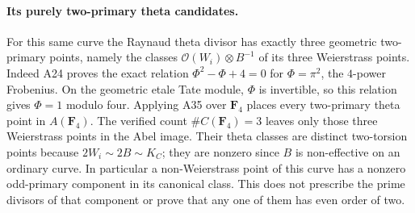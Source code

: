 \paragraph{Its purely two-primary theta candidates.}
For this same curve the Raynaud theta divisor has exactly three
geometric two-primary points, namely the classes
$\mathcal O(W_i)\otimes B^{-1}$ of its three Weierstrass points.
Indeed A24 proves the exact relation
$\Phi^2-\Phi+4=0$ for $\Phi=\pi^2$, the $4$-power Frobenius.
On the geometric etale Tate module, $\Phi$ is invertible, so
this relation gives $\Phi=1$ modulo four. Applying A35 over
$\mathbf F_4$ places every two-primary theta point in
$A(\mathbf F_4)$. The verified count
$\#C(\mathbf F_4)=3$ leaves only those three Weierstrass
points in the Abel image. Their theta classes are distinct
two-torsion points because $2W_i\sim2B\sim K_C$; they are
nonzero since $B$ is non-effective on an ordinary curve.
In particular a non-Weierstrass point of this curve has a
nonzero odd-primary component in its canonical class. This
does not prescribe the prime divisors of that component or
prove that any one of them has even order of two.
